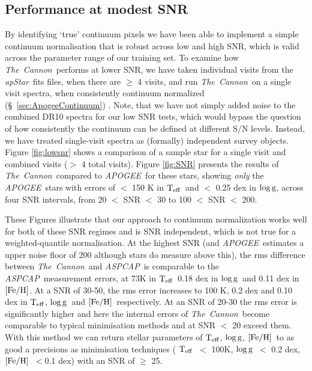 \documentclass[12pt, preprint]{aastex}
\newcommand{\teff}{\mbox{$\rm T_{eff}$}}
\newcommand{\feh}{\mbox{$\rm [Fe/H]$}}
\newcommand{\logg}{\mbox{$\rm \log g$}}
\newcommand{\tc}{\textsl{The~Cannon}}
\newcommand{\apogee}{\textsl{APOGEE}}
\newcommand{\aspcap}{\textsl{ASPCAP}}
\newcommand{\apstar}{\textsl{apStar}}
\begin{document}
 \subsection{Performance at modest SNR}
 \label{sec:lowSNR}


By identifying `true' continuum pixels we have been able to implement a simple continuum normalisation that is robust across low and high SNR, which is valid across the parameter range of our training set. To examine how \tc\ performs at lower SNR, we have taken individual visits from the \apstar\ fits files, when there are $\ge$ 4 visits, and run \tc\ on a single visit spectra, when consistently continuum normalized (\S~\ref{sec:ApogeeContinuum}) . Note, that we have not simply added noise to the combined DR10 spectra for our low SNR tests, which would bypass the question of how consistently the continuum can be defined at different S/N levels. Instead, we have treated single-visit spectra as (formally) independent survey objects. Figure \ref{fig:lowsnr} shows a comparison of a sample star for a single visit and combined visits ($>$ 4 total visits). Figure \ref{fig:SNR} presents the results of \tc\ compared to \apogee\ for these stars, showing \textit{only} the \apogee\ stars with errors of $<$ 150 K in \teff\ and $<$ 0.25 dex in \logg, across four SNR intervals, from 20 $<$ SNR $<$ 30 to 100 $<$ SNR $<$ 200.

These Figures illustrate that our approach to continuum normalization works well for both of these SNR regimes and is SNR independent, which is not true for a weighted-quantile normalisation. At the highest SNR (and \apogee\ estimates a upper noise floor of 200 although stars do measure above this), the rms difference between \tc\ and \aspcap\ is comparable to the \aspcap\ measurement errors, at 73K in \teff\, 0.18 dex in \logg\ and 0.11 dex in \feh. At a SNR of 30-50, the rms error increases to 100 K, 0.2 dex and 0.10 dex in \teff, \logg\ and \feh\, respectively. At an SNR of 20-30 the rms error is significantly higher and here the internal errors of \tc\ become comparable to typical minimisation methods and at SNR $<$ 20 exceed them. With this method we can return stellar parameters of \teff, \logg, \feh\ to as good a precisions as minimisation techniques ( \teff\ $<$ 100K, \logg\ $<$ 0.2 dex, \feh\ $< $0.1 dex) with an SNR of $\ge$ 25. 
 
\end{document}
